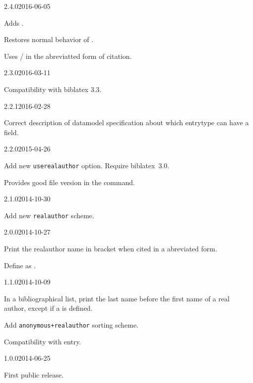 \documentclass{ltxdockit}[2011/03/25]
\newcommand{\biblatex}{biblatex\xspace}
\begin{document}
\begin{changelog}

  \begin{release}{2.4.0}{2016-06-05}
    \item Adds .
    \item Restores normal behavior of .
    \item Uses  /  in the abreviatted form of citation.
  \end{release}

  \begin{release}{2.3.0}{2016-03-11}
  \item Compatibility with biblatex 3.3.
  \end{release}

  \begin{release}{2.2.1}{2016-02-28}
  \item Correct description of datamodel specification about which entrytype can have a  field.
  \end{release}


  \begin{release}{2.2.0}{2015-04-26}
  \item Add new \verb|userealauthor| option. Require \biblatex~3.0. 
  \item Provides good file version in the  command.
  \end{release}

  \begin{release}{2.1.0}{2014-10-30}
  \item Add new \verb|realauthor| scheme. 
  \end{release}


  \begin{release}{2.0.0}{2014-10-27}
  \item Print the realauthor name in bracket when cited in a abreviated form.
  \item Define  as . 
  \end{release}

\begin{release}{1.1.0}{2014-10-09}
\item In a bibliographical list, print the last name before the first name of a real author, except if a  is defined.
\item Add \verb|anonymous+realauthor| sorting scheme.   
\item Compatibility with  entry. 
\end{release}

\begin{release}{1.0.0}{2014-06-25}
\item First public release.
\end{release}
\end{changelog}
\end{document}
